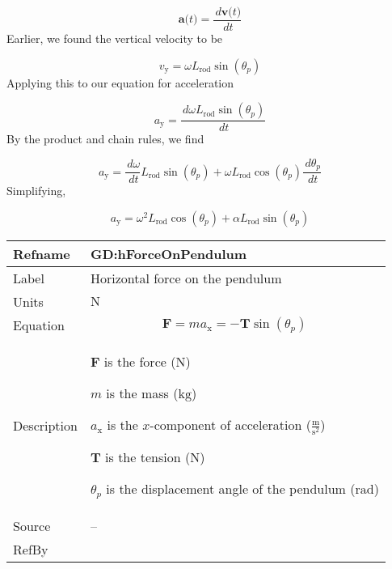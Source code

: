 \documentclass[12pt]{article}
\begin{document}
\begin{displaymath}
\symbf{a}\text{(}t\text{)}=\frac{\,d\symbf{v}\text{(}t\text{)}}{\,dt}
\end{displaymath}
Earlier, we found the vertical velocity to be

\begin{displaymath}
{v_{\text{y}}}=ω {L_{\text{rod}}} \sin\left({θ_{p}}\right)
\end{displaymath}
Applying this to our equation for acceleration

\begin{displaymath}
{a_{\text{y}}}=\frac{\,dω {L_{\text{rod}}} \sin\left({θ_{p}}\right)}{\,dt}
\end{displaymath}
By the product and chain rules, we find

\begin{displaymath}
{a_{\text{y}}}=\frac{\,dω}{\,dt} {L_{\text{rod}}} \sin\left({θ_{p}}\right)+ω {L_{\text{rod}}} \cos\left({θ_{p}}\right) \frac{\,d{θ_{p}}}{\,dt}
\end{displaymath}
Simplifying,

\begin{displaymath}
{a_{\text{y}}}=ω^{2} {L_{\text{rod}}} \cos\left({θ_{p}}\right)+α {L_{\text{rod}}} \sin\left({θ_{p}}\right)
\end{displaymath}
\vspace{\baselineskip}
\noindent
\begin{minipage}{\textwidth}
\begin{tabular}{>{\raggedright}p{}>{\raggedright\arraybackslash}p{}}
\toprule \textbf{Refname} & \textbf{GD:hForceOnPendulum}
\label{GD:hForceOnPendulum}
\\ \midrule
Label & Horizontal force on the pendulum
        
\\ \midrule
Units & ${\text{N}}$
        
\\ \midrule
Equation & \begin{displaymath}
           \symbf{F}=m {a_{\text{x}}}=-\symbf{T} \sin\left({θ_{p}}\right)
           \end{displaymath}
\\ \midrule
Description & \begin{symbDescription}
              \item{$\symbf{F}$ is the force (${\text{N}}$)}
              \item{$m$ is the mass (${\text{kg}}$)}
              \item{${a_{\text{x}}}$ is the $x$-component of acceleration ($\frac{\text{m}}{\text{s}^{2}}$)}
              \item{$\symbf{T}$ is the tension (${\text{N}}$)}
              \item{${θ_{p}}$ is the displacement angle of the pendulum (${\text{rad}}$)}
              \end{symbDescription}
\\ \midrule
Source & --
         
\\ \midrule
RefBy & 
\\ \bottomrule
\end{tabular}
\end{minipage}
\end{document}
